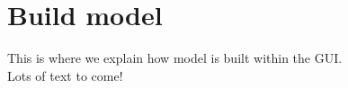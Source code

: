 
\chapter{Build model}
\minitoc

This is where we explain how model is built within the GUI. \\
Lots of text to come!